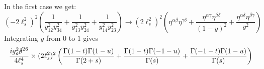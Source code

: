\documentclass[11pt, class=article, crop=false]{standalone}
\begin{document}
\begin{enumerate}
	In the first case we get:
	\[
		\left(-2 \ell_s^2\right)^2 \left(\frac{1}{y_{12}^2 y_{34}^2} + \frac{1}{y_{13}^2 y_{24}^2} + \frac{1}{y_{14}^2 y_{23}^2} \right) \to \left(2 \ell_s^2\right)^2  \left(\eta^{\alpha \beta} \eta^{\gamma \delta} + \frac{\eta^{\alpha \gamma} \eta^{\beta \delta}}{(1-y)^{2}} + \frac{\eta^{\alpha \delta} \eta^{\beta \gamma}}{y^{2}} \right)  %
	\]
	Integrating $y$ from $0$ to $1$ gives
	\begin{equation}\label{eq:part1}
		\frac{i g_o^2 \cancel\delta^{26}}{4 \ell_s^4} \times (2 \ell_s^2)^2 \left(\frac{\Gamma(1-t) \Gamma(1-u)}{\Gamma(2+s)} + \frac{\Gamma(1-t) \Gamma(-1-u)}{\Gamma(s)} + \frac{\Gamma(-1-t) \Gamma(1-u)}{\Gamma(s)} \right)		
	\end{equation}

	

\end{enumerate}
\end{document}
